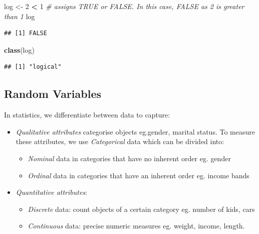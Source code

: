 \documentclass[]{book}
\newenvironment{Shaded}{\begin{snugshade}}{\end{snugshade}}
\newcommand{\CommentTok}[1]{\textcolor[rgb]{0.56,0.35,0.01}{\textit{#1}}}
\newcommand{\DecValTok}[1]{\textcolor[rgb]{0.00,0.00,0.81}{#1}}
\newcommand{\KeywordTok}[1]{\textcolor[rgb]{0.13,0.29,0.53}{\textbf{#1}}}
\newcommand{\NormalTok}[1]{#1}
\newcommand{\OperatorTok}[1]{\textcolor[rgb]{0.81,0.36,0.00}{\textbf{#1}}}
\newcommand{\StringTok}[1]{\textcolor[rgb]{0.31,0.60,0.02}{#1}}
\providecommand{\tightlist}{%
  \setlength{\itemsep}{0pt}\setlength{\parskip}{0pt}}
\begin{document}
\begin{Shaded}
\begin{Highlighting}[]
\NormalTok{log <-}\StringTok{ }\DecValTok{2} \OperatorTok{<}\StringTok{ }\DecValTok{1} \CommentTok{# assigns TRUE or FALSE. In this case, FALSE as 2 is greater than 1}
\NormalTok{log}
\end{Highlighting}
\end{Shaded}

\begin{verbatim}
## [1] FALSE
\end{verbatim}

\begin{Shaded}
\begin{Highlighting}[]
\KeywordTok{class}\NormalTok{(log)}
\end{Highlighting}
\end{Shaded}

\begin{verbatim}
## [1] "logical"
\end{verbatim}

\hypertarget{random-variables}{%
\subsection{Random Variables}\label{random-variables}}

In statistics, we differentiate between data to capture:

\begin{itemize}
\item
  \emph{Qualitative attributes} categorise objects eg.gender, marital status. To measure these attributes, we use \emph{Categorical} data which can be divided into:

  \begin{itemize}
  \tightlist
  \item
    \emph{Nominal} data in categories that have no inherent order eg. gender
  \item
    \emph{Ordinal} data in categories that have an inherent order eg. income bands
  \end{itemize}
\item
  \emph{Quantitative attributes}:

  \begin{itemize}
  \tightlist
  \item
    \emph{Discrete} data: count objects of a certain category eg. number of kids, cars
  \item
    \emph{Continuous} data: precise numeric measures eg. weight, income, length.
  \end{itemize}
\end{itemize}
\end{document}
